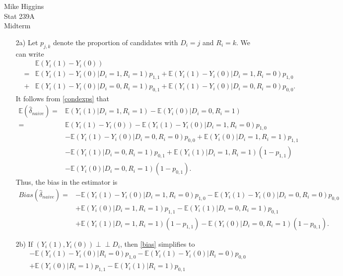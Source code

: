 \documentclass[11pt]{report}
\newcommand{\indep}{\perp\!\!\!\perp}
\newcommand{\E}[0]{\mathbb{E}}
\begin{document}
\flushright
Mike Higgins\\
Stat 239A\\
Midterm\\
\flushleft
\begin{itemize}
\item[2a)]
	Let $p_{j,k}$ denote the proportion of candidates with $D_i = j$ and $R_i = k$.
	We can write
	\begin{eqnarray}
	&&\E(Y_i(1) - Y_i(0))\nonumber \\
	&=&\E(Y_i(1) - Y_i(0)| D_i = 1, R_i = 1)p_{1,1} +
	   \E(Y_i(1) - Y_i(0)| D_i = 1, R_i = 0)p_{1,0}\nonumber \\
	&+&\E(Y_i(1) - Y_i(0)| D_i = 0, R_i = 1)p_{0,1}+
		 \E(Y_i(1) - Y_i(0)| D_i = 0, R_i = 0)p_{0,0}.
	\label{condexps}
	\end{eqnarray}
	It follows from \eqref{condexps} that
	\begin{align}
		\E(\hat \delta_{naive})  = & \E(Y_i(1)|D_i = 1, R_i = 1) - \E(Y_i(0)|D_i = 0, R_i = 1) 
		\nonumber \\
		= &\E(Y_i(1) - Y_i(0)) -\E(Y_i(1) - Y_i(0)| D_i = 1, R_i = 0)p_{1,0} \nonumber \\
		 &- \E(Y_i(1) - Y_i(0)| D_i = 0, R_i = 0)p_{0,0} + \E(Y_i(0)| D_i = 1, R_i = 1)p_{1,1} 
		 \nonumber \\
		 & - \E(Y_i(1)| D_i = 0, R_i = 1)p_{0,1} + \E(Y_i(1)| D_i = 1, R_i = 1)(1 - p_{1,1}) \nonumber \\
		 & - \E(Y_i(0)|D_i = 0, R_i = 1)(1 - p_{0,1}).
		 \label{ugequal}
	\end{align}
	Thus, the bias in the estimator is
	\begin{align}
		Bias(\hat \delta_{naive}) = &
		 - \E(Y_i(1) - Y_i(0)| D_i = 1, R_i = 0)p_{1,0} -\E(Y_i(1) - Y_i(0)| D_i = 0, R_i = 0)p_{0,0} \nonumber \\
		 & + \E(Y_i(0)| D_i = 1, R_i = 1)p_{1,1}  - \E(Y_i(1)| D_i = 0, R_i = 1)p_{0,1} \nonumber \\
		 & + \E(Y_i(1)| D_i = 1, R_i = 1)(1 - p_{1,1}) - \E(Y_i(0)|D_i = 0, R_i = 1)(1 - p_{0,1}). 
		 \label{bias}
	\end{align}
\item[2b)] 
	If $(Y_i(1),Y_i(0)) \indep D_i$, then \eqref{bias} simplifies to
	\begin{align}
		& - \E(Y_i(1) - Y_i(0)| R_i = 0)p_{1,0} - \E(Y_i(1) - Y_i(0)| R_i = 0)p_{0,0} \nonumber \\
		 & + \E(Y_i(0)|  R_i = 1)p_{1,1}  - \E(Y_i(1)|  R_i = 1)p_{0,1} \nonumber \\

\end{align}
\end{itemize}
\end{document}
